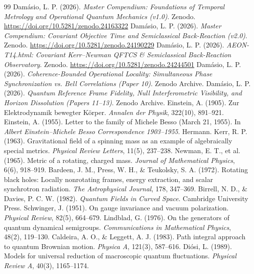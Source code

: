 \documentclass[11pt,a4paper]{article}
\begin{document}
\begin{thebibliography}{99}
\small
{} Damásio, L. P. (2026). \textit{Master Compendium: Foundations of Temporal Metrology and Operational Quantum Mechanics (v1.0)}. Zenodo. \url{https://doi.org/10.5281/zenodo.24163322}
 Damásio, L. P. (2026). \textit{Master Compendium: Covariant Objective Time and Semiclassical Back-Reaction (v2.0)}. Zenodo. \url{https://doi.org/10.5281/zenodo.24190229}
 Damásio, L. P. (2026). \textit{AEON-T14.html: Covariant Kerr--Newman QFTCS \& Semiclassical Back-Reaction Observatory}. Zenodo. \url{https://doi.org/10.5281/zenodo.24244501}
 Damásio, L. P. (2026). \textit{Coherence-Bounded Operational Locality: Simultaneous Phase Synchronization vs. Bell Correlations (Paper 10)}. Zenodo Archive.
 Damásio, L. P. (2026). \textit{Quantum Reference Frame Fidelity, Null Interferometric Visibility, and Horizon Dissolution (Papers 11--13)}. Zenodo Archive.
 Einstein, A. (1905). Zur Elektrodynamik bewegter Körper. \textit{Annalen der Physik}, 322(10), 891--921.
 Einstein, A. (1955). Letter to the family of Michele Besso (March 21, 1955). In \textit{Albert Einstein--Michele Besso Correspondence 1903--1955}. Hermann.
 Kerr, R. P. (1963). Gravitational field of a spinning mass as an example of algebraically special metrics. \textit{Physical Review Letters}, 11(5), 237--238.
 Newman, E. T., et al. (1965). Metric of a rotating, charged mass. \textit{Journal of Mathematical Physics}, 6(6), 918--919.
 Bardeen, J. M., Press, W. H., \& Teukolsky, S. A. (1972). Rotating black holes: Locally nonrotating frames, energy extraction, and scalar synchrotron radiation. \textit{The Astrophysical Journal}, 178, 347--369.
 Birrell, N. D., \& Davies, P. C. W. (1982). \textit{Quantum Fields in Curved Space}. Cambridge University Press.
 Schwinger, J. (1951). On gauge invariance and vacuum polarization. \textit{Physical Review}, 82(5), 664--679.
 Lindblad, G. (1976). On the generators of quantum dynamical semigroups. \textit{Communications in Mathematical Physics}, 48(2), 119--130.
 Caldeira, A. O., \& Leggett, A. J. (1983). Path integral approach to quantum Brownian motion. \textit{Physica A}, 121(3), 587--616.
 Diósi, L. (1989). Models for universal reduction of macroscopic quantum fluctuations. \textit{Physical Review A}, 40(3), 1165--1174.

\end{thebibliography}
\end{document}
